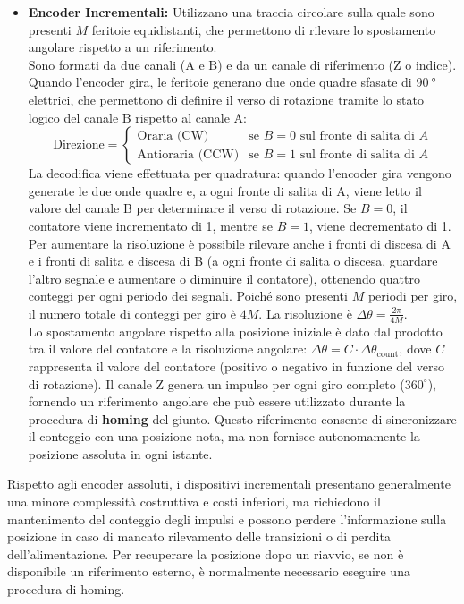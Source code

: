 ﻿\documentclass[11pt, a4paper]{article}
\begin{document}
\begin{itemize}
    \item \textbf{Encoder Incrementali:} Utilizzano una traccia circolare sulla quale sono presenti $M$ feritoie equidistanti, che permettono di rilevare lo spostamento angolare rispetto a un riferimento.\\
    Sono formati da due canali (A e B) e da un canale di riferimento (Z o indice). Quando l'encoder gira, le feritoie generano due onde quadre sfasate di $\SI{90}{\degree}$ elettrici, che permettono di definire il verso di rotazione tramite lo stato logico del canale B rispetto al canale A:
    \[
        \text{Direzione} =
        \begin{cases}
            \text{Oraria (CW)} & \text{se } B=0 \text{ sul fronte di salita di } A\\
            \text{Antioraria (CCW)} & \text{se } B=1 \text{ sul fronte di salita di } A
        \end{cases}
    \]
    La decodifica viene effettuata per quadratura: quando l'encoder gira vengono generate le due onde quadre e, a ogni fronte di salita di A, viene letto il valore del canale B per determinare il verso di rotazione. Se $B=0$, il contatore viene incrementato di 1, mentre se $B=1$, viene decrementato di 1. Per aumentare la risoluzione è possibile rilevare anche i fronti di discesa di A e i fronti di salita e discesa di B (a ogni fronte di salita o discesa, guardare l'altro segnale e aumentare o diminuire il contatore), ottenendo quattro conteggi per ogni periodo dei segnali. Poiché sono presenti $M$ periodi per giro, il numero totale di conteggi per giro è $4M$. La risoluzione è $\Delta\theta = \frac{2\pi}{4M}$.\\
    Lo spostamento angolare rispetto alla posizione iniziale è dato dal prodotto tra il valore del contatore e la risoluzione angolare: $\Delta\theta = C \cdot \Delta\theta_{\text{count}}$, dove $C$ rappresenta il valore del contatore (positivo o negativo in funzione del verso di rotazione).
    Il canale Z genera un impulso per ogni giro completo ($360^\circ$), fornendo un riferimento angolare che può essere utilizzato durante la procedura di \textbf{homing} del giunto. Questo riferimento consente di sincronizzare il conteggio con una posizione nota, ma non fornisce autonomamente la posizione assoluta in ogni istante.
\end{itemize}
Rispetto agli encoder assoluti, i dispositivi incrementali presentano generalmente una minore complessità costruttiva e costi inferiori, ma richiedono il mantenimento del conteggio degli impulsi e possono perdere l'informazione sulla posizione in caso di mancato rilevamento delle transizioni o di perdita dell'alimentazione. Per recuperare la posizione dopo un riavvio, se non è disponibile un riferimento esterno, è normalmente necessario eseguire una procedura di homing.
\newpage
\end{document}
